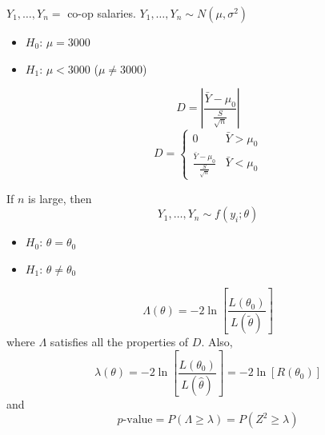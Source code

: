 \begin{exbox}
    \begin{example}
        $ Y_1,\ldots ,Y_n = $ co-op salaries. $ Y_1,\ldots ,Y_n \sim N(\mu,\sigma^2) $
        \begin{itemize}
            \item $ H_0 $: $ \mu=3000 $
            \item $ H_1 $: $ \mu<3000 $ ($ \mu\neq 3000 $)
        \end{itemize}
        \[ D=\left|\frac{\bar{Y}-\mu_0}{\frac{S}{\sqrt{n}}} \right| \]
        \[ D=
            \begin{cases}
                0                                        & \bar{Y}>\mu_0 \\
                \frac{\bar{Y}-\mu_0}{\frac{S}{\sqrt{n}}} & \bar{Y}<\mu_0
            \end{cases} \]
    \end{example}
\end{exbox}
If $ n $ is large, then
\[ Y_1,\ldots ,Y_n \sim f(y_i;\theta) \]
\begin{itemize}
    \item $ H_0 $: $ \theta=\theta_0 $
    \item $ H_1 $: $ \theta\neq \theta_0 $
\end{itemize}
\[ \Lambda(\theta)=-2\ln\left[ \frac{L(\theta_0)}{L(\tilde{\theta})} \right] \]
where $ \Lambda $ satisfies all the properties of $ D $. Also,
\[ \lambda(\theta)=-2\ln\left[ \frac{L(\theta_0)}{L(\hat{\theta})}\right]
    =-2\ln\left[ R(\theta_0) \right] \]
and
\[ p\text{-value}=P(\Lambda\geqslant \lambda)=P(Z^2\geqslant \lambda) \]
